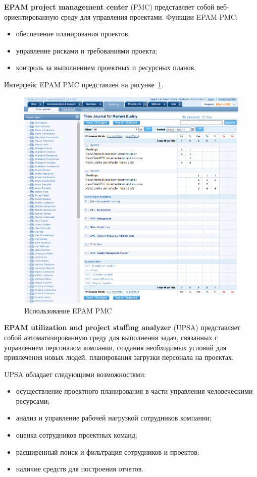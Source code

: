 \newpage 

\textbf{EPAM project management center} (PMC) представляет собой веб-ориентированную среду
для управления проектами. 
Функции EPAM PMC:
\begin{itemize}
\item обеспечение планирования проектов;
\item управление рисками и требованиями проекта;
\item контроль за выполнением проектных и ресурсных планов.
\end{itemize}

Интерфейс EPAM PMC представлен на рисунке~\ref{pic:epam_pmc}.

\begin{figure}[h!]
  \centering
  \includegraphics[width=150mm]{pic/epam_pmc.png}
  \caption{Использование EPAM PMC}
  \label{pic:epam_pmc}
\end{figure}

\newpage

\textbf{EPAM utilization and project staffing analyzer} (UPSA) представляет собой
автоматизированную среду для выполнения задач, связанных с управлением персоналом компании,
создания необходимых условий для привлечения новых людей, планирования загрузки персонала на проектах.

UPSA обладает следующими возможностями:
\begin{itemize}
\item осуществление проектного планирования в части управления человеческими ресурсами;
\item анализ и управление рабочей нагрузкой сотрудников компании;
\item оценка сотрудников проектных команд;
\item расширенный поиск и фильтрация сотрудников и проектов;
\item наличие средств для построения отчетов.
\end{itemize}

